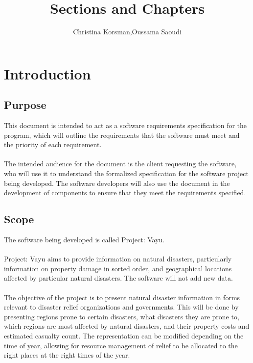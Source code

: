 \documentclass{article}
\title{Sections and Chapters}
\author{Christina Korsman,Oussama Saoudi}
\date{ }
\begin{document}
  
\maketitle
  
\tableofcontents
\pagebreak
 
\section{Introduction}
\subsection{Purpose}
    This document is intended to act as a software requirements specification 
    for the program, which will outline the requirements that the software 
    must meet and the priority of each requirement. \\\\
The intended audience for the document is the client requesting the software, 
who will use it to understand the formalized specification for the software 
project being developed. The software developers will also use the document 
in the development of components to ensure that they meet the requirements specified.
 
\subsection{Scope}
	The software being developed is called Project: Vayu.\\\\
 
 Project: Vayu aims to provide information on natural disasters, 
 particularly information on property damage in sorted order, and 
 geographical locations affected by particular natural disasters. 
 The software will not add new data.\\\\
 
The objective of the project is to present natural disaster information in forms relevant to
disaster relief organizations and governments. This will be done by presenting regions prone to
certain disasters, what disasters they are prone to, which regions are most affected by natural disasters, 
and their property costs and estimated casualty count. The representation can be 
modified depending on the time of year, allowing for 
resource management of relief to be allocated to the right places 
at the right times of the year.
 
\end{document}
